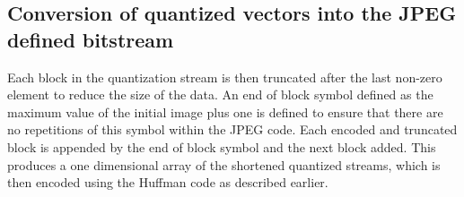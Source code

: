\documentclass[11pt,a4paper,table]{article}
\begin{document}
\subsection{Conversion of quantized vectors into the JPEG defined bitstream}
Each block in the quantization stream is then truncated after the last non-zero element to reduce the size of the data. An end of block symbol defined as the maximum value of the initial image plus one is defined to ensure that there are no repetitions of this symbol within the JPEG code. Each encoded and truncated block is appended by the end of block symbol and the next block added. This produces a one dimensional array of the shortened quantized streams, which is then encoded using the Huffman code as described earlier.

\pagebreak



\pagebreak
\end{document}
